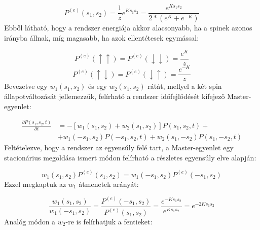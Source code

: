 \begin{equation} \label{eq:8}
    P^{\left( e \right)} \left( s_{1}, s_{2} \right)
    =
    \frac{1}{z} e^{K s_{1} s_{2}}
    =
    \frac{e^{K s_{1} s_{2}}}{2 * \left( e^{K} + e^{-K} \right)}
\end{equation}
Ebből látható, hogy a rendszer energiája akkor alacsonyabb, ha a spinek azonos irányba állnak, míg magasabb, ha azok ellentétesek egymással:

\begin{equation} \label{eq:9}
    P^{\left( e \right)} \left( \uparrow \uparrow \right)
    =
    P^{\left( e \right)} \left( \downarrow \downarrow \right)
    =
    \frac{e^{K}}{z}
\end{equation}
\begin{equation} \label{eq:10}
    P^{\left( e \right)} \left( \uparrow \downarrow \right)
    =
    P^{\left( e \right)} \left( \downarrow \uparrow \right)
    =
    \frac{e^{-K}}{z}
\end{equation}
Bevezetve egy $w_{1} \left( s_{1}, s_{2} \right)$ és egy $w_{2} \left( s_{1}, s_{2} \right)$ rátát, mellyel a két spin állapotváltozását jellemezzük, felírható a rendszer időfejlődését kifejező Master-egyenlet:

\begin{align} \label{eq:11}
    \frac{\partial P \left( s_{1}, s_{2}, t \right)}{\partial t}
    &=
    - \left[ w_{1} \left( s_{1}, s_{2} \right) + w_{2} \left( s_{1}, s_{2} \right) \right] P \left( s_{1}, s_{2}, t \right)
    + \nonumber \\
    &+
    w_{1} \left( - s_{1}, s_{2} \right) P \left( - s_{1}, s_{2}, t \right) + w_{2} \left( s_{1}, - s_{2} \right) P \left( s_{1}, - s_{2}, t \right)
\end{align}
Feltételezve, hogy a rendszer az egyensúly felé tart, a Master-egyenlet egy stacionárius megoldása ismert módon felírható a részletes egyensúly elve alapján:

\begin{equation} \label{eq:12}
    w_{1} \left( s_{1}, s_{2} \right) P^{\left( e \right)} \left( s_{1}, s_{2} \right)
    =
    w_{1} \left( - s_{1}, s_{2} \right) P^{\left( e \right)} \left( - s_{1}, s_{2} \right)
\end{equation}
Ezzel megkaptuk az $w_{1}$ átmenetek arányát:

\begin{equation} \label{eq:13}
    \frac{w_{1} \left( s_{1}, s_{2} \right)}{w_{1} \left( - s_{1}, s_{2} \right)}
    =
    \frac{P^{\left( e \right)} \left( - s_{1}, s_{2} \right)}{P^{\left( e \right)} \left( s_{1}, s_{2} \right)}
    =
    \frac{e^{- K s_{1} s_{2}}}{e^{K s_{1} s_{2}}}
    =
    e^{- 2 K s_{1} s_{2}}
\end{equation}
Analóg módon a $w_{2}$-re is felírhatjuk a fentieket:

